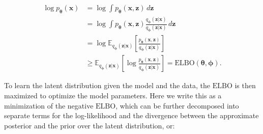 \documentclass[11pt,a4paper,twoside]{book}
\begin{document}
\begin{doublespace}
\begin{appendices}
\begin{subequations}
\begin{align}
    \log p_{\boldsymbol{\theta}}(\mathbf{x}) &= \log \int p_{\boldsymbol{\theta}}(\mathbf{x}, \mathbf{z}) \, d\mathbf{z} \\
    &= \log \int p_{\boldsymbol{\theta}}(\mathbf{x}, \mathbf{z}) \frac{q_{\boldsymbol{\phi}}(\mathbf{z} | \mathbf{x})}{q_{\boldsymbol{\phi}}(\mathbf{z} | \mathbf{x})} \, d\mathbf{z} \\
    &= \log \mathbb{E}_{q_{\boldsymbol{\phi}}(\mathbf{z} | \mathbf{x})}\left[\frac{p_{\boldsymbol{\theta}}(\mathbf{x}, \mathbf{z})}{q_{\boldsymbol{\phi}}(\mathbf{z} | \mathbf{x})}\right] \\
    &\geq \mathbb{E}_{    q_{\boldsymbol{\phi}}(\mathbf{z} | \mathbf{x})}\left[\log\frac{p_{\boldsymbol{\theta}}(\mathbf{x}, \mathbf{z})}{q_{\boldsymbol{\phi}}(\mathbf{z} | \mathbf{x})}\right] = \mathrm{ELBO}(\boldsymbol{\theta}, \boldsymbol{\phi}).
\end{align}
\end{subequations}

To learn the latent distribution given the model and the data, the $\mathrm{ELBO}$ is then maximized to optimize the model parameters. Here we write this as a minimization of the negative $\mathrm{ELBO}$, which can be further decomposed into separate terms for the log-likelihood and the divergence between the approximate posterior and the prior over the latent distribution, or:


\end{appendices}
\end{doublespace}
\end{document}
